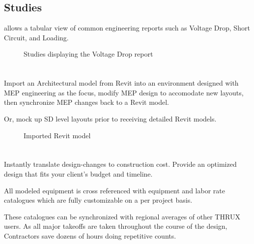 \documentclass[letterpaper,10pt,english]{sphinxmanual}
\begin{document}
\subsection{Studies}
\label{\detokenize{docs/productoverview/index-product_overview:studies}}
{\hyperref[\detokenize{docs/userguide/buildingelectricalmodel/studies/index-studies:studies}]{}} allows a tabular view of common engineering reports such as Voltage Drop, Short Circuit, and Loading.

\begin{figure}[H]
\centering
\capstart

\noindent{}
\caption{Studies displaying the Voltage Drop report}\label{\detokenize{docs/productoverview/index-product_overview:id3}}\end{figure}


\section{}
\label{\detokenize{docs/productoverview/index-product_overview:revit-interoperability}}
Import an Architectural model from Revit into an environment designed with MEP engineering as the focus, modify MEP design to accomodate new layouts, then synchronize MEP changes back to a Revit model.

Or, mock up SD level layouts prior to receiving detailed Revit models.

\begin{figure}[H]
\centering
\capstart

\noindent{}
\caption{Imported Revit model}\label{\detokenize{docs/productoverview/index-product_overview:id4}}\end{figure}


\section{}
\label{\detokenize{docs/productoverview/index-product_overview:pricing}}
Instantly translate design-changes to construction cost.  Provide an optimized design that fits your client’s budget and timeline.

All modeled equipment is cross referenced with equipment and labor rate catalogues which are fully customizable on a per project basis.

These catalogues can be synchronized with regional averages of other THRUX users.  As all major takeoffs are taken throughout the course of the design, Contractors save dozens of hours doing repetitive counts.
\end{document}

